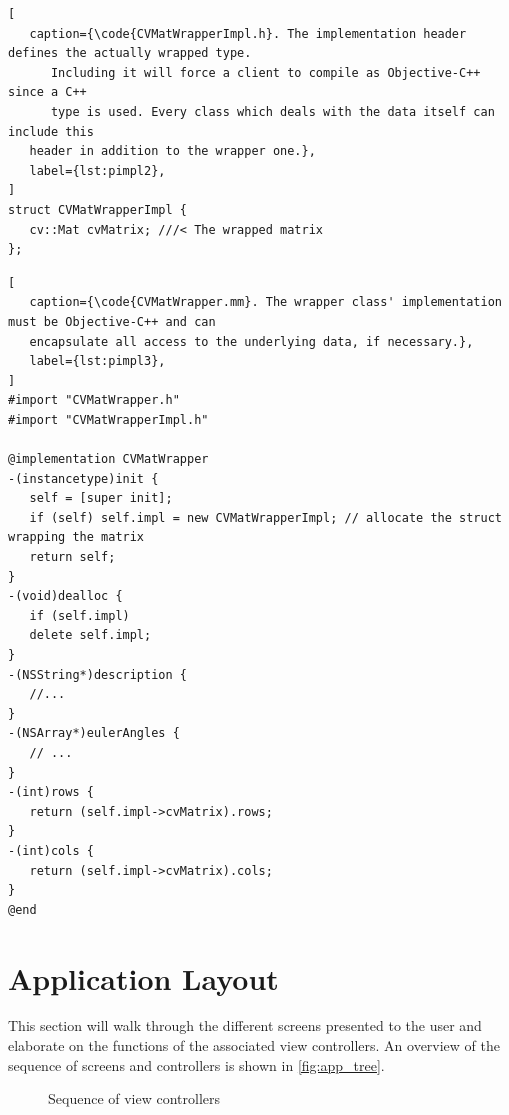 \begin{lstlisting}[
   caption={\code{CVMatWrapperImpl.h}. The implementation header defines the actually wrapped type.
      Including it will force a client to compile as Objective-C++ since a C++
      type is used. Every class which deals with the data itself can include this
   header in addition to the wrapper one.},
   label={lst:pimpl2},
]
struct CVMatWrapperImpl {
   cv::Mat cvMatrix; ///< The wrapped matrix
};
\end{lstlisting}

\begin{lstlisting}[
   caption={\code{CVMatWrapper.mm}. The wrapper class' implementation must be Objective-C++ and can
   encapsulate all access to the underlying data, if necessary.},
   label={lst:pimpl3},
]
#import "CVMatWrapper.h"
#import "CVMatWrapperImpl.h"

@implementation CVMatWrapper
-(instancetype)init {
   self = [super init];
   if (self) self.impl = new CVMatWrapperImpl; // allocate the struct wrapping the matrix
   return self;
}
-(void)dealloc {
   if (self.impl)
   delete self.impl;
}
-(NSString*)description {
   //...
}
-(NSArray*)eulerAngles {
   // ...
}
-(int)rows {
   return (self.impl->cvMatrix).rows;
}
-(int)cols {
   return (self.impl->cvMatrix).cols;
}
@end
\end{lstlisting}

\section{Application Layout}

This section will walk through the different screens presented to the user and
elaborate on the functions of the associated view controllers. An overview of
the sequence of screens and controllers is shown in \autoref{fig:app_tree}.

\begin{figure}[h]
   {\centering      
      
   \caption{Sequence of view controllers}
   \label{fig:app_tree}}
\end{figure}

\FloatBarrier

\newcommand*{\button}[1]{
   \tikzexternaldisable
   \tikz[baseline=-.5ex]{\node[inner sep=1pt,outer sep=0,draw,rounded corners=2pt]{\small\texttt{#1}};}
   \tikzexternalenable
}

\newcommand*{\nofloat}[2]{
   \begin{center}
      \fbox{
         \texttt{[image: \#1]}
      }
      \captionof{figure}{#2}
   \end{center}
}

